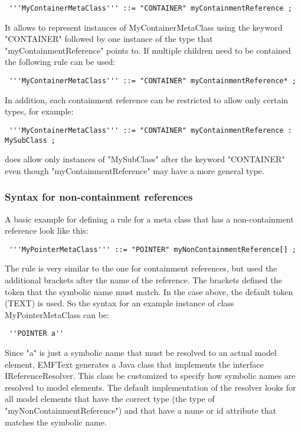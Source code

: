\begin{lstlisting}
 '''MyContainerMetaClass''' ::= "CONTAINER" myContainmentReference ;
\end{lstlisting}

It allows to represent instances of MyContainerMetaClass using the keyword "CONTAINER" followed by one instance of the type that "myContainmentReference" points to. If multiple children need to be contained the following rule can be used:

\begin{lstlisting}
 '''MyContainerMetaClass''' ::= "CONTAINER" myContainmentReference* ;
\end{lstlisting}

In addition, each containment reference can be restricted to allow only certain types, for example:

\begin{lstlisting}
 '''MyContainerMetaClass''' ::= "CONTAINER" myContainmentReference : MySubClass ;
\end{lstlisting}

does allow only instances of "MySubClass" after the keyword "CONTAINER" even though "myContainmentReference" may have a more general type.

\subsubsection{Syntax for non-containment references}

A basic example for defining a rule for a meta class that has a non-containment reference look like this:

\begin{lstlisting}
 '''MyPointerMetaClass''' ::= "POINTER" myNonContainmentReference[] ;
\end{lstlisting}

The rule is very similar to the one for containment references, but used the additional brackets after the name of the reference. The brackets defined the token that the symbolic name must match. In the case above, the default token (TEXT) is used. So the syntax for an example instance of class MyPointerMetaClass can be:

\begin{lstlisting}
 ''POINTER a''
\end{lstlisting}

Since "a" is just a symbolic name that must be resolved to an actual model element, EMFText generates a Java class that implements the interface IReferenceResolver. This class be customized to specify how symbolic names are resolved to model elements. The default implementation of the resolver looks for all model elements that have the correct type (the type of "myNonContainmentReference") and that have a name or id attribute that matches the symbolic name.

